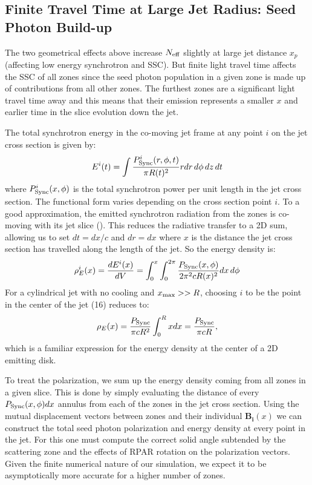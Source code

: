 \subsection{Finite Travel Time at Large Jet Radius: Seed Photon Build-up}

The two geometrical effects above increase $N_{\rm eff}$ slightly at large jet distance $x_p$ (affecting low energy synchrotron and SSC). But finite light travel time affects the SSC of all zones since the seed photon population in a given zone is made up of contributions from all other zones. The furthest zones are a significant light travel time away and this means that their emission represents a smaller $x$ and earlier time in the slice evolution down the jet.

The total synchrotron energy in the co-moving jet frame at any point $i$ on the jet cross section is given by:
\begin{equation}
E^i(t) = \int \frac{P^i_{\rm Sync}(r,\phi,t)}{\pi R(t)^2} rdr\,d\phi\, dz\,dt
\end{equation}
where $P^i_{\rm Sync}(x,\phi)$ is the total synchrotron power per unit length in the jet cross section. The functional form varies depending on the cross section point $i$. %
To a good approximation, the emitted synchrotron radiation from the zones is co-moving with its jet slice (). This reduces the radiative transfer to a 2D sum, allowing us to set $dt = dx/c$ and $dr = dx$ where $x$ is the distance the jet cross section has travelled along the length of the jet. So the energy density is:
\begin{equation}
\begin{aligned}
\rho^i_E(x) = \frac{dE^i(x)}{dV} = \int_0^x\int_0^{2\pi} \frac{P_{\rm Sync}(x,\phi)}{2\pi^2 c R(x)^2} dx\,d\phi
\end{aligned} 
\end{equation}
For a cylindrical jet with no cooling and $x_{\rm max}>>R$, choosing $i$ to be the point in the center of the jet (16) reduces to:
\begin{equation}
\rho_E(x) =  \frac{P_{\rm Sync}}{\pi c R^2}\int_0^R x dx = \frac{P_{\rm Sync}}{\pi c R },
\end{equation}
which is a familiar expression for the energy density at the center of a 2D emitting disk.

To treat the polarization, we sum up the energy density coming from all zones in a given slice. This is done by simply evaluating the distance of every $P_{\rm Sync}(x,\phi)dx$ annulus from each of the zones in the jet cross section. Using the mutual displacement vectors between zones and their individual $\mathbf{B_i}(x)$ we can construct the total seed photon polarization and energy density at every point in the jet. For this one must compute the correct solid angle subtended by the scattering zone and the effects of RPAR rotation on the polarization vectors. Given the finite numerical nature of our simulation, we expect it to be asymptotically more accurate for a higher number of zones.

